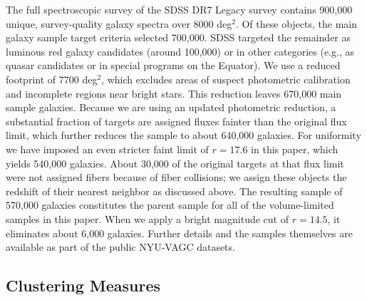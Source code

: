 \documentclass[]{emulateapj}
\begin{document}
The full spectroscopic survey of the SDSS DR7 Legacy
survey contains 900,000 unique, survey-quality galaxy
spectra over 8000 deg$^2$.   Of these objects, the main
galaxy sample target criteria selected 700,000.   SDSS
targeted the remainder as luminous red galaxy candidates
(around 100,000) or in other categories (e.g., as quasar
candidates or in special programs on the Equator).
We use a reduced footprint of 7700 deg$^2$, which excludes
areas of suspect photometric calibration \citep{padmanabhan08} 
and incomplete regions near bright stars. 
This reduction leaves 670,000 main sample galaxies. Because
we are using an updated photometric reduction, a
substantial fraction of targets are assigned fluxes fainter than
the original flux limit, which further reduces the sample to about
640,000 galaxies.  For uniformity we have imposed an
even stricter faint limit of $r=17.6$ in this paper, which yields
540,000 galaxies.   About 30,000 of the original targets
at that flux limit were not assigned fibers because of fiber collisions;
we assign these objects the redshift of their nearest
neighbor as discussed above.
The resulting sample of 570,000 galaxies
constitutes the parent sample for all of the volume-limited
samples in this paper.  When we apply a bright magnitude
cut of $r=14.5$, it eliminates about 6,000 galaxies.
Further details and the samples themselves are available 
as part of the public NYU-VAGC datasets.


\subsection{Clustering Measures}
\label{subsec:xi}
\end{document}
